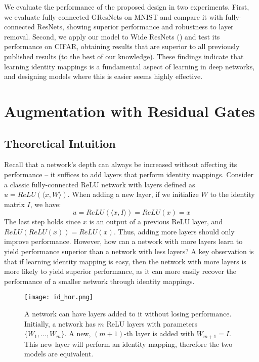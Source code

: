 \documentclass{article} %
\begin{document}
We evaluate the performance of the proposed design in two experiments. First, we evaluate fully-connected GResNets on MNIST and compare it with fully-connected ResNets, showing superior performance and robustness to layer removal. Second, we apply our model to Wide ResNets (\cite{wide}) and test its performance on CIFAR, obtaining results that are superior to all previously published results (to the best of our knowledge). These findings indicate that learning identity mappings is a fundamental aspect of learning in deep networks, and designing models where this is easier seems highly effective.













\section{Augmentation with Residual Gates}

\subsection{Theoretical Intuition}

Recall that a network's depth can always be increased without affecting its performance -- it suffices to add layers that perform identity mappings. Consider a classic fully-connected ReLU network with layers defined as $u = ReLU( \langle x,W \rangle )$. When adding a new layer, if we initialize $W$ to the identity matrix $I$, we have:
\begin{equation*}
	u = ReLU(\langle x, I \rangle) = ReLU(x) = x
\end{equation*}
The last step holds since $x$ is an output of a previous ReLU layer, and $ReLU(ReLU(x)) = ReLU(x)$. Thus, adding more layers should only improve performance. However, how can a network with more layers learn to yield performance superior than a network with less layers? A key observation is that if learning identity mapping is easy, then the network with more layers is more likely to yield superior performance, as it can more easily recover the performance of a smaller network through identity mappings. 



\begin{figure}[!ht]
  \centering
    \texttt{[image: id\_hor.png]}
  \caption{A network can have layers added to it without losing performance. Initially, a network has $m$ ReLU layers with parameters $\{W_1, \dots, W_m \}$. A new, $(m+1)$-th layer is added with $W_{m+1} = I$. This new layer will perform an identity mapping, therefore the two models are equivalent.}
\label{id}
\end{figure}
\end{document}
